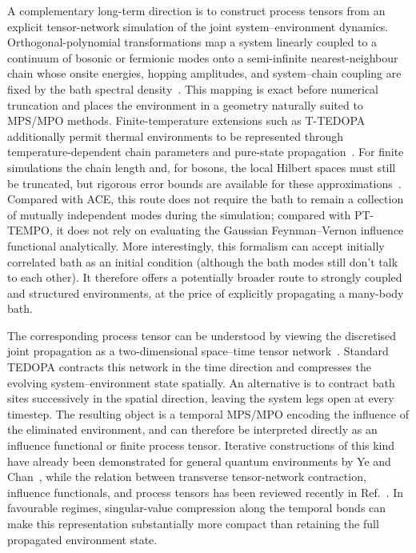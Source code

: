 A complementary long-term direction is to construct process tensors from an explicit tensor-network simulation of the joint system--environment dynamics.
Orthogonal-polynomial transformations map a system linearly coupled to a continuum of bosonic or fermionic modes onto a semi-infinite nearest-neighbour chain whose onsite energies, hopping amplitudes, and system--chain coupling are fixed by the bath spectral density~\cite{chin2010chain,prior2010tedopa}.
This mapping is exact before numerical truncation and places the environment in a geometry naturally suited to MPS/MPO methods.
Finite-temperature extensions such as T-TEDOPA additionally permit thermal environments to be represented through temperature-dependent chain parameters and pure-state propagation~\cite{tamascelli2019ttedopa}.
For finite simulations the chain length and, for bosons, the local Hilbert spaces must still be truncated, but rigorous error bounds are available for these approximations~\cite{woods2015errorbars}.
Compared with ACE, this route does not require the bath to remain a collection of mutually independent modes during the simulation; compared with PT-TEMPO, it does not rely on evaluating the Gaussian Feynman--Vernon influence functional analytically.
More interestingly, this formalism can accept initially correlated bath as an initial condition (although the bath modes still don't talk to each other).
It therefore offers a potentially broader route to strongly coupled and structured environments, at the price of explicitly propagating a many-body bath.

The corresponding process tensor can be understood by viewing the discretised joint propagation as a two-dimensional space--time tensor network~\cite{Keeling2026}.
Standard TEDOPA contracts this network in the time direction and compresses the evolving system--environment state spatially.
An alternative is to contract bath sites successively in the spatial direction, leaving the system legs open at every timestep.
The resulting object is a temporal MPS/MPO encoding the influence of the eliminated environment, and can therefore be interpreted directly as an influence functional or finite process tensor.
Iterative constructions of this kind have already been demonstrated for general quantum environments by Ye and Chan~\cite{ye2021influence}, while the relation between transverse tensor-network contraction, influence functionals, and process tensors has been reviewed recently in Ref.~\cite{cerezo2025spatiotemporal}.
In favourable regimes, singular-value compression along the temporal bonds can make this representation substantially more compact than retaining the full propagated environment state.

